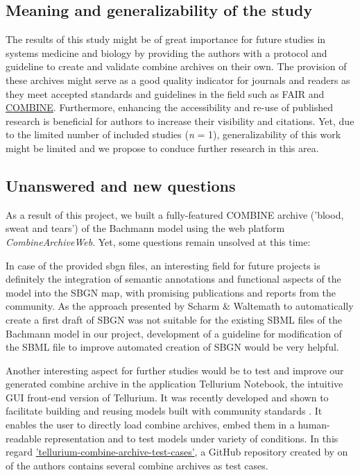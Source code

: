 \subsection*{Meaning and generalizability of the study}
The results of this study might be of great importance for future studies in systems medicine and biology by providing the authors with a protocol and guideline to create and validate \ac{combine} archives on their own. The provision of these archives might serve as a good quality indicator for journals and readers as they meet accepted standards and guidelines in the field such as FAIR \cite{wilkinson2016fair} and \hyperlink{http://co.mbine.org/}{COMBINE}. Furthermore, enhancing the accessibility and re-use of published research is beneficial for authors to increase their visibility and citations. Yet, due to the limited number of included studies (\textit{n} = 1), generalizability of this work might be limited and we propose to conduce further research in this area.

\subsection*{Unanswered and new questions}
As a result of this project, we built a fully-featured COMBINE archive ('blood, sweat and tears') of the Bachmann model \cite{bachmannmodel} using the web platform \textit{CombineArchiveWeb}. Yet, some questions remain unsolved at this time:

In case of the provided \acf{sbgn} files, an interesting field for future projects is definitely the integration of semantic annotations and functional aspects of the model into the SBGN map, with promising publications and reports from the community. As the approach presented by Scharm \& Waltemath \cite{combine} to automatically create a first draft of SBGN was not suitable for the existing SBML files of the Bachmann model in our project, development of a guideline for modification of the SBML file to improve automated creation of SBGN would be very helpful.

Another interesting aspect for further studies would be to test and improve our generated \ac{combine} archive in the application Tellurium Notebook, the intuitive GUI front-end version of Tellurium. It was recently developed and shown to facilitate building and reusing models built with community standards \cite{choi2018tellurium}. It enables the user to directly load \ac{combine} archives, embed them in a human-readable representation and to test models under variety of conditions. In this regard \hyperlink{https://github.com/0u812/tellurium-combine-archive-test-cases}{'tellurium-combine-archive-test-cases'}, a GitHub repository created by on of the authors contains several \ac{combine} archives as test cases.

